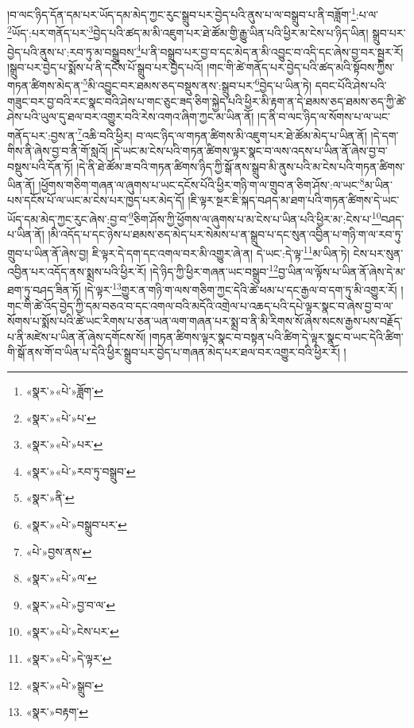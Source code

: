 །བ་ལང་ཉིད་དོན་དམ་པར་ཡོད་དམ་མེད་ཀྱང་རུང་སྒྲུབ་པར་བྱེད་པའི་ནུས་པ་ལ་བསྒྲུབ་པ་ནི་བཟློག་\footnote{«སྣར་»«པེ་»ཟློག་}:པ་ལ་\footnote{«སྣར་»«པེ་»པ་}ཡོད་:པར་གནོད་པར་\footnote{«སྣར་»«པེ་»པར་}བྱེད་པའི་ཚད་མ་མི་འཇུག་པར་ཐེ་ཚོམ་གྱི་རྒྱུ་ཡིན་པའི་ཕྱིར་མ་ངེས་པ་ཉིད་ཡིན། སྒྲུབ་པར་བྱེད་པའི་ནུས་པ་:རབ་ཏུ་མ་བསྒྲུབས་\footnote{«སྣར་»«པེ་»རབ་ཏུ་བསྒྲུབ་}པ་ནི་བསྒྲུབ་པར་བྱ་བ་དང་མེད་ན་མི་འབྱུང་བ་འདི་དང་ཞེས་བྱ་བར་སྦྱར་རོ། །སྒྲུབ་པར་བྱེད་པ་སྨོས་པ་ནི་དངོས་པོ་སྒྲུབ་པར་བྱེད་པའོ། །གང་གི་ཚེ་གནོད་པར་བྱེད་པའི་ཚད་མའི་སྟོབས་ཀྱིས་གཏན་ཚིགས་མེད་ན་\footnote{«སྣར་»ནི་}མི་འབྱུང་བར་ཐམས་ཅད་བསྡུས་ནས་:སྒྲུབ་པར་\footnote{«སྣར་»«པེ་»བསྒྲུབ་པར་}བྱེད་པ་ཡིན་ཏེ། དབང་པོའི་ཤེས་པའི་གཟུང་བར་བྱ་བའི་རང་སྣང་བའི་ཤེས་པ་གང་ཅུང་ཟད་ཅིག་སྐྱེད་པའི་ཕྱིར་མི་རྟག་ན་དེ་ཐམས་ཅད་ཐམས་ཅད་ཀྱི་ཚེ་ཤེས་པའི་ཡུལ་དུ་ཐལ་བར་འགྱུར་བའི་རེས་འགའ་ཞིག་ཀྱང་མ་ཡིན་ནོ། །ད་ནི་བ་ལང་ཉིད་ལ་སོགས་པ་ལ་ཡང་གནོད་པར་:བྱས་ན་\footnote{«པེ་»བྱས་ནས་}འཆི་བའི་ཕྱིར། བ་ལང་ཉིད་ལ་གཏན་ཚིགས་མི་འཇུག་པར་ཐེ་ཚོམ་མེད་པ་ཡིན་ནོ། །དེ་དག་གིས་ནི་ཞེས་བྱ་བ་ནི་གོ་སླའོ། །དེ་ཡང་མ་ངེས་པའི་གཏན་ཚིགས་ལྟར་སྣང་བ་ལས་འདས་པ་ཡིན་ནོ་ཞེས་བྱ་བ་བསྡུས་པའི་དོན་ཏོ། །དེ་ནི་ཐེ་ཚོམ་ཟ་བའི་གཏན་ཚིགས་ཉིད་ཀྱི་སྒོ་ནས་སྒྲུབ་མི་ནུས་པའི་མ་ངེས་པའི་གཏན་ཚིགས་ཡིན་ནོ། །ཕྱོགས་གཅིག་གཞན་ལ་ཞུགས་པ་ཡང་དངོས་པོའི་ཕྱིར་གཉི་ག་ལ་གྲུབ་ན་ཅིག་ཤོས་:ལ་ཡང་\footnote{«སྣར་»«པེ་»ལ་}མ་ཡིན་པས་དངོས་པོ་ལ་ཡང་མ་ངེས་པར་ཁྱད་པར་མེད་དོ། །ཇི་ལྟར་སྔར་ཇི་སྐད་བཤད་མ་ཐག་པའི་གཏན་ཚིགས་དེ་ཡང་ཡོད་དམ་མེད་ཀྱང་རུང་ཞེས་:བྱ་བ་\footnote{«སྣར་»«པེ་»བྱ་བ་ལ་}ཅིག་ཤོས་ཀྱི་ཕྱོགས་ལ་ཞུགས་པ་མ་ངེས་པ་ཡིན་པའི་ཕྱིར་མ་:ངེས་པ་\footnote{«སྣར་»«པེ་»ངེས་པར་}བཤད་པ་ཡིན་ནོ། །མི་འདོད་པ་དང་ཉེས་པ་ཐམས་ཅད་མེད་པར་སེམས་པ་ན་སྒྲུབ་པ་དང་སུན་འབྱིན་པ་གཉི་ག་ལ་རབ་ཏུ་གྲུབ་པ་ཡིན་ནོ་ཞེས་བྱ། ཇི་ལྟར་དེ་དག་དང་འགལ་བར་མི་འགྱུར་ཞེ་ན། དེ་ཡང་:དེ་ལྟ་\footnote{«སྣར་»«པེ་»དེ་ལྟར་}མ་ཡིན་ཏེ། ངེས་པར་སུན་འབྱིན་པར་འདོད་ནས་སྨྲས་པའི་ཕྱིར་རོ། །དེ་ཉིད་ཀྱི་ཕྱིར་གཞན་ཡང་བསྒྲུབ་\footnote{«སྣར་»«པེ་»སྒྲུབ་}བྱ་ཡིན་ལ་ལྟོས་པ་ཡིན་ནོ་ཞེས་དེ་མ་ཐག་ཏུ་བཤད་ཟིན་ཏོ། །དེ་ལྟར་\footnote{«སྣར་»བརྟག་}གྱུར་ན་གཉི་ག་ལས་གཅིག་ཀྱང་དེའི་ཚེ་ཕམ་པ་དང་རྒྱལ་བ་དག་ཏུ་མི་འགྱུར་རོ། །གང་གི་ཚེ་འོད་བྱེད་ཀྱི་དམ་བཅའ་བ་དང་འགལ་བའི་མདོའི་འགྲེལ་པ་འཆད་པའི་དཔེ་ལྟར་སྣང་བ་ཞེས་བྱ་བ་ལ་སོགས་པ་སྨོས་པའི་ཚེ་ཡང་རིགས་པ་ཅན་ཡན་ལག་གཞན་པར་སྨྲ་བ་ནི་མི་རིགས་སོ་ཞེས་སངས་རྒྱས་པས་བརྗོད་པ་ནི་མཛེས་པ་ཡིན་ནོ་ཞེས་དགོངས་སོ། །གཏན་ཚིགས་ལྟར་སྣང་བ་བསྟན་པའི་ཚིག་དེ་ལྟར་སྣང་བ་ཡང་དེའི་ཚིག་གི་སྒོ་ནས་གོ་བ་ཡིན་པ་དེའི་ཕྱིར་སྒྲུབ་པར་བྱེད་པ་གཞན་མེད་པར་ཐལ་བར་འགྱུར་བའི་ཕྱིར་རོ། །
